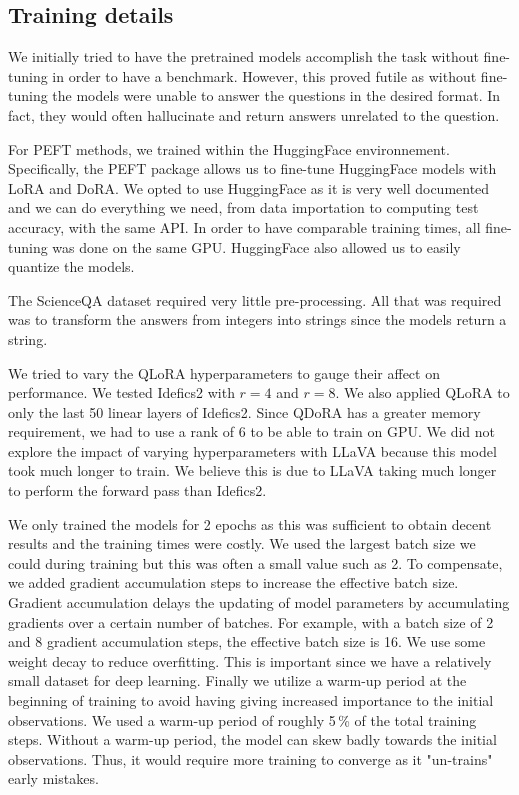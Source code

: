 \documentclass{article}
\begin{document}
\subsection{Training details}

We initially tried to have the pretrained models accomplish the task without fine-tuning in order to have a benchmark. However, this proved futile as without fine-tuning the models were unable to answer the questions in the desired format. In fact, they would often hallucinate and return answers unrelated to the question.

For PEFT methods, we trained within the HuggingFace environnement. Specifically, the PEFT package allows us to fine-tune HuggingFace models with LoRA and DoRA. We opted to use HuggingFace as it is very well documented and we can do everything we need, from data importation to computing test accuracy, with the same API. In order to have comparable training times, all fine-tuning was done on the same GPU. HuggingFace also allowed us to easily quantize the models.

The ScienceQA dataset required very little pre-processing. All that was required was to transform the answers from integers into strings since the models return a string.

We tried to vary the QLoRA hyperparameters to gauge their affect on performance. We tested Idefics2 with $r=4$ and $r=8$. We also applied QLoRA to only the last 50 linear layers of Idefics2. Since QDoRA has a greater memory requirement, we had to use a rank of 6 to be able to train on GPU. We did not explore the impact of varying hyperparameters with LLaVA because this model took much longer to train. We believe this is due to LLaVA taking much longer to perform the forward pass than Idefics2.

We only trained the models for 2 epochs as this was sufficient to obtain decent results and the training times were costly. We used the largest batch size we could during training but this was often a small value such as 2. To compensate, we added gradient accumulation steps to increase the effective batch size. Gradient accumulation delays the updating of model parameters by accumulating gradients over a certain number of batches. For example, with a batch size of 2 and 8 gradient accumulation steps, the effective batch size is 16. We use some weight decay to reduce overfitting. This is important since we have a relatively small dataset for deep learning. Finally we utilize a warm-up period at the beginning of training to avoid having giving increased importance to the initial observations. We used a warm-up period of roughly 5\,\% of the total training steps. Without a warm-up period, the model can skew badly towards the initial observations. Thus, it would require more training to converge as it "un-trains" early mistakes.
\end{document}
